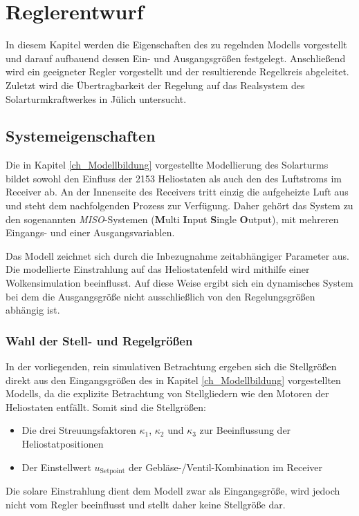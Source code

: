 \chapter{Reglerentwurf} \label{ch_Reglerentwurf}
In diesem Kapitel werden die Eigenschaften des zu regelnden Modells vorgestellt und darauf aufbauend dessen Ein- und Ausgangsgrößen festgelegt.
Anschließend wird ein geeigneter Regler vorgestellt und der resultierende Regelkreis abgeleitet.
Zuletzt wird die Übertragbarkeit der Regelung auf das Realsystem des Solarturmkraftwerkes in Jülich untersucht.

\section{Systemeigenschaften} \label{sec_Systemeigenschaften}
Die in Kapitel \ref{ch_Modellbildung} vorgestellte Modellierung des Solarturms bildet sowohl den Einfluss der 2153 Heliostaten als auch den des Luftstroms im Receiver ab.
An der Innenseite des Receivers tritt einzig die aufgeheizte Luft aus und steht dem nachfolgenden Prozess zur Verfügung.
Daher gehört das System zu den sogenannten \mbox{\textit{MISO}-Systemen} (\textbf{M}ulti \textbf{I}nput \textbf{S}ingle \textbf{O}utput), mit mehreren Eingangs- und einer Ausgangsvariablen.

Das Modell zeichnet sich durch die Inbezugnahme zeitabhängiger Parameter aus.
Die modellierte Einstrahlung auf das Heliostatenfeld wird mithilfe einer Wolkensimulation beeinflusst.
Auf diese Weise ergibt sich ein dynamisches System bei dem die Ausgangsgröße nicht ausschließlich von den Regelungsgrößen abhängig ist.


\subsection{Wahl der Stell- und Regelgrößen} \label{subsec_EinAusgangsgrößen}
In der vorliegenden, rein simulativen Betrachtung ergeben sich die Stellgrößen direkt aus den Eingangsgrößen des in Kapitel \ref{ch_Modellbildung} vorgestellten Modells, da die explizite Betrachtung von Stellgliedern wie den Motoren der Heliostaten entfällt.
Somit sind die Stellgrößen:
\begin{itemize}
    \item Die drei Streuungsfaktoren $\kappa_1$, $\kappa_2$ und $\kappa_3$ zur Beeinflussung der Heliostatpositionen
    \item Der Einstellwert $u_{\mathrm{Setpoint}}$ der Gebläse-/Ventil-Kombination im Receiver
\end{itemize}
Die solare Einstrahlung dient dem Modell zwar als Eingangsgröße, wird jedoch nicht vom Regler beeinflusst und stellt daher keine Stellgröße dar.


